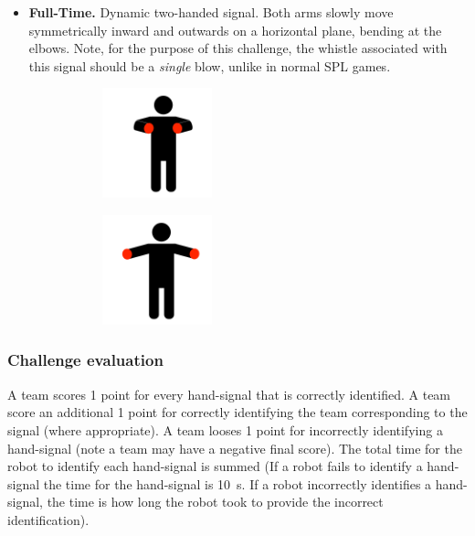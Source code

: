 \begin{itemize}
            \item \textbf{Full-Time.}
            Dynamic two-handed signal. Both arms slowly move symmetrically inward and outwards on a horizontal plane, bending at the elbows. Note, for the purpose of this challenge, the whistle associated with this signal should be a \textit{single} blow, unlike in normal SPL games.
            \begin{figure}[ht!]
                \centering
                \begin{subfigure}{.33\textwidth}
                  \includegraphics[height=120px]{figs/referee-signals/full-time-start.png}
                \end{subfigure}
                \begin{subfigure}{.33\textwidth}
                  \includegraphics[height=120px]{figs/referee-signals/full-time-end.png}
                \end{subfigure}
            \end{figure}

        \end{itemize}

    \subsubsection{Challenge evaluation}
        A team scores 1 point for every hand-signal that is correctly identified. A team score an additional 1 point for correctly identifying the team corresponding to the signal (where appropriate). A team looses 1 point for incorrectly identifying a hand-signal (note a team may have a negative final score). The total time for the robot to identify each hand-signal is summed (If a robot fails to identify a hand-signal the time for the hand-signal is \qty{10}{\second}. If a robot incorrectly identifies a hand-signal, the time is how long the robot took to provide the incorrect identification).
    

